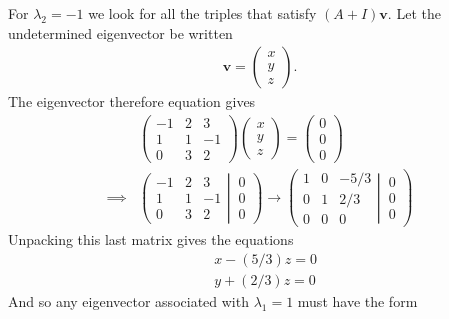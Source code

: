 {For $\lambda_2=-1$ we look for all the triples that satisfy $\left( A +  I \right) \mathbf{v}$. Let the undetermined eigenvector be written
\begin{align*}
\mathbf{v} = \begin{pmatrix} x \\ y \\ z \end{pmatrix}.
\end{align*}
The eigenvector therefore equation gives
\begin{align*}
& \begin{pmatrix}
 -1 &  2 &  3 \\
  1 &  1 & -1 \\
  0 &  3 &  2
\end{pmatrix}
\begin{pmatrix} x \\ y \\ z \end{pmatrix}
= 
\begin{pmatrix}
  0 \\
  0  \\
  0 
\end{pmatrix}
\\
\implies &
\left(
	\begin{matrix}
 -1 &  2 &  3 \\
  1 &  1 & -1 \\
  0 &  3 &  2
	\end{matrix}
  \left| \, 
	\begin{matrix}
  0 \\
  0 \\
  0 
	\end{matrix}
  \right.
\right)
\to
\left(
	\begin{matrix}
  1 &  0 & -5/3 \\
  0 &  1 &  2/3 \\
  0 &  0 &  0
	\end{matrix}
  \left| \, 
	\begin{matrix}
	  0 \\
	  0 \\
	  0 
    \end{matrix}
  \right.
\right)
\end{align*}
Unpacking this last matrix gives the equations
\begin{align*}
& x - (5/3)z = 0 \\
& y + (2/3)z = 0
\end{align*}
And so any eigenvector associated with $\lambda_1=1$ must have the form
}
